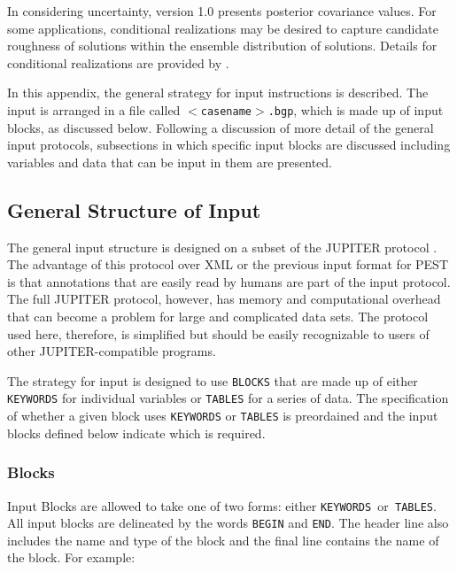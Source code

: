 \documentclass[11pt,oneside,onecolumn]{usgsreport}
\begin{document}
\begin{multicols}{2}
In considering uncertainty, version 1.0 presents posterior covariance
values. For some applications, conditional realizations may be desired
to capture candidate roughness of solutions within the ensemble distribution
of solutions. Details for conditional realizations are provided by
\citet{Kitanidis1995}.




\end{multicols}
\begin{appendix}

In this appendix, the general strategy for input instructions is described.
The input is arranged in a file called \texttt{$<$casename$>$.bgp}, which
is made up of input blocks, as discussed below. Following a discussion
of more detail of the general input protocols, subsections in which
specific input blocks are discussed including variables and data that
can be input in them are presented. 


\subsection{General Structure of Input}

The general input structure is designed on a subset of the JUPITER
protocol \citep{BantaEtAl2006}. The advantage of this protocol over
XML or the previous input format for PEST is that annotations that
are easily read by humans are part of the input protocol. The full
JUPITER protocol, however, has memory and computational overhead that
can become a problem for large and complicated data sets. The protocol
used here, therefore, is simplified but should be easily recognizable
to users of other JUPITER-compatible programs.

The strategy for input is designed to use \texttt{BLOCKS} that are
made up of either \texttt{KEYWORDS} for individual variables or \texttt{TABLES}
for a series of data. The specification of whether a given block uses
\texttt{KEYWORDS} or \texttt{TABLES} is preordained and the input
blocks defined below indicate which is required.


\subsubsection{Blocks}

Input Blocks are allowed to take one of two forms: either \texttt{KEYWORDS
}or\texttt{ TABLES}. All input blocks are delineated by the words
\texttt{BEGIN} and \texttt{END}. The header line also includes the
name and type of the block and the final line contains the name of
the block. For example:


\end{appendix}
\end{document}
